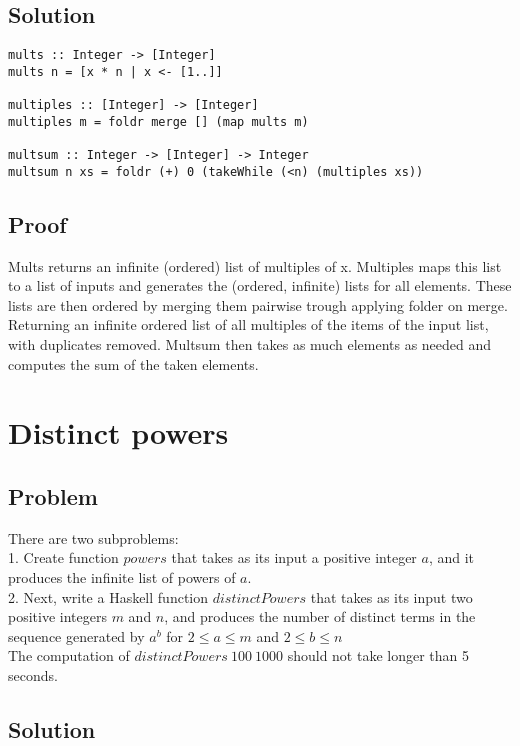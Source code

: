 \documentclass[a4paper,11pt]{article}
\begin{document}
\subsection{Solution}

\begin{lstlisting}
mults :: Integer -> [Integer]
mults n = [x * n | x <- [1..]]

multiples :: [Integer] -> [Integer]
multiples m = foldr merge [] (map mults m)

multsum :: Integer -> [Integer] -> Integer
multsum n xs = foldr (+) 0 (takeWhile (<n) (multiples xs))
\end{lstlisting}

\subsection{Proof}

Mults returns an infinite (ordered) list of multiples of x. Multiples maps this list to a list of inputs and generates the (ordered, infinite) lists for all elements. These lists are then ordered by merging them pairwise trough applying folder on merge. Returning an infinite ordered list of all multiples of the items of the input list, with duplicates removed. Multsum then takes as much elements as needed and computes the sum of the taken elements.

\section{Distinct powers}
\subsection{Problem}
There are two subproblems:\\
1. Create function $powers$ that takes as its input a positive integer $a$, and it produces the infinite
list of powers of $a$.\\
2. Next, write a Haskell function $distinctPowers$ that takes as its input two positive integers $m$ and
$n$, and produces the number of distinct terms in the sequence generated by $a^b$ for $2 \leq a \leq m$ and $2 \leq b \leq n$\\
The computation of $distinctPowers\: 100\: 1000$ should not take longer than 5 seconds.
\subsection{Solution}
\end{document}
